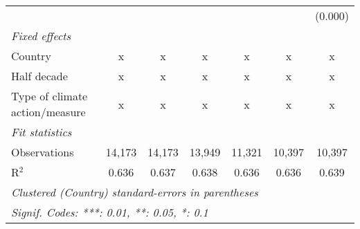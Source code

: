 \begin{tabular}{lcccccc}
                                                                 &         &         &         &                &               & (0.000)\\   
   \emph{Fixed effects}\\
   Country                                                       & x       & x       & x       & x              & x             & x\\  
   Half decade                                                   & x       & x       & x       & x              & x             & x\\  
   Type of climate action/measure                                & x       & x       & x       & x              & x             & x\\  
   \midrule \emph{Fit statistics}\\
   Observations                                                  & 14,173  & 14,173  & 13,949  & 11,321         & 10,397        & 10,397\\  
   R$^2$                                                         & 0.636   & 0.637   & 0.638   & 0.636          & 0.636         & 0.639\\  
   \midrule
   \multicolumn{7}{l}{\emph{Clustered (Country) standard-errors in parentheses}}\\
   \multicolumn{7}{l}{\emph{Signif. Codes: ***: 0.01, **: 0.05, *: 0.1}}\\
\end{tabular}
\par\endgroup


